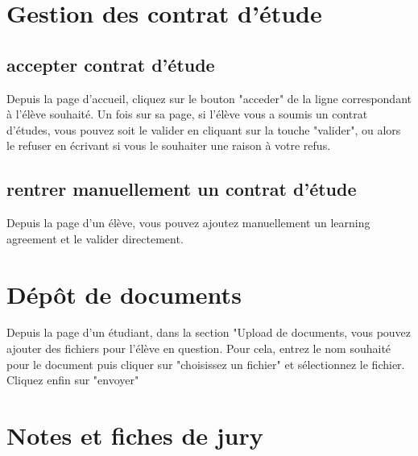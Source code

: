 \section{Gestion des contrat d'étude}

\subsection{accepter contrat d'étude}
Depuis la page d'accueil, cliquez sur le bouton "acceder" de la ligne correspondant à l'élève souhaité. Un fois sur sa page, si l'élève vous a soumis un contrat d'études, vous pouvez soit le valider en cliquant sur la touche "valider", ou alors le refuser en écrivant si vous le souhaiter une raison à votre refus.

\subsection{rentrer manuellement un contrat d'étude}
Depuis la page d'un élève, vous pouvez ajoutez manuellement un learning agreement et le valider directement.

\section{Dépôt de documents}

Depuis la page d'un étudiant, dans la section "Upload de documents, vous pouvez ajouter des fichiers pour l'élève en question. Pour cela, entrez le nom souhaité pour le document puis cliquer sur "choisissez un fichier" et sélectionnez le fichier. Cliquez enfin sur "envoyer" 

\section{Notes et fiches de jury}

